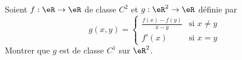 \begin{exercice}\label{exoCalculDifferentiel0020}

Soient $f:\eR \to \eR$ de classe $C^2$ et $g : \eR ^2 \to \eR$ définie par
\begin{equation}
	g(x,y) =
	\begin{cases}
		\displaystyle\frac{f(x)- f(y)}{x-y}	&	\text{si }x\neq y\\
		f'(x)	&	 \text{si }x=y
	\end{cases}
	\end{equation}
	Montrer que $g$ est de classe $C^1$ sur $\eR ^2$.
\end{exercice}

